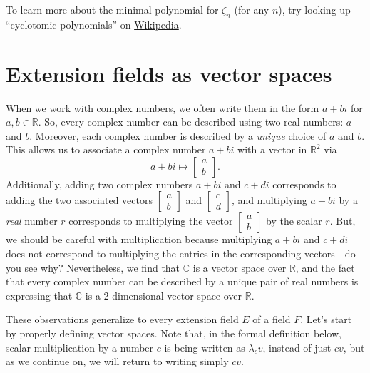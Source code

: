 To learn more about the minimal polynomial for $\zeta_n$ (for any $n$), try looking up ``cyclotomic polynomials'' on \href{https://en.wikipedia.org/wiki/Cyclotomic_polynomial}{Wikipedia}.

\section{Extension fields as vector spaces}

When we work with complex numbers, we often write them in the form $a+bi$ for $a,b\in \mathbb{R}$. So, every complex number can be described using two real numbers: $a$ and $b$. Moreover, each complex number is described by a \emph{unique} choice of $a$ and $b$. This allows us to associate a complex number $a+bi$ with a vector in $\mathbb{R}^2$ via
\[ a+bi\mapsto \begin{bmatrix} a\\b\end{bmatrix}.\]
Additionally, adding two complex numbers $a+bi$ and $c+di$ corresponds to adding the two associated vectors $\left[\begin{smallmatrix} a\\b\end{smallmatrix}\right]$ and $\left[\begin{smallmatrix} c\\d\end{smallmatrix}\right]$, and multiplying $a+bi$ by a \emph{real} number $r$ corresponds to multiplying the vector $\left[\begin{smallmatrix} a\\b\end{smallmatrix}\right]$ by the scalar $r$. But, we should be careful with multiplication because multiplying $a+bi$ and $c+di$ does not correspond to multiplying the entries in the corresponding vectors---do you see why? Nevertheless, we find that $\mathbb{C}$ is a vector space over $\mathbb{R}$, and the fact that every complex number can be described by a unique pair of real numbers is expressing that $\mathbb{C}$ is a $2$-dimensional vector space over $\mathbb{R}$. 

These observations generalize to every extension field $E$ of a field $F$. Let's start by properly defining vector spaces. Note that, in the formal definition below, scalar multiplication by a number $c$ is being written as $\lambda_cv$, instead of just $cv$, but as we continue on, we will return to writing simply $cv$.


